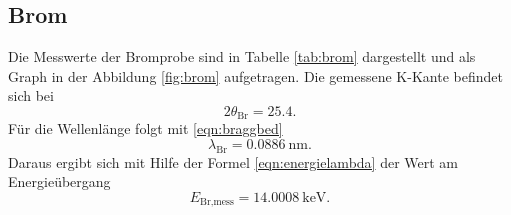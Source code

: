 \subsection{Brom}

Die Messwerte der Bromprobe sind in Tabelle \ref{tab:brom} dargestellt und als
Graph in der Abbildung \ref{fig:brom} aufgetragen.
Die gemessene K-Kante befindet sich bei
\begin{equation}
  2\theta_\text{Br} = 25.4 .
\end{equation}
Für die Wellenlänge folgt mit \eqref{eqn:braggbed}
\begin{equation}
  \lambda_\text{Br} = \SI{0.0886}{\nano\meter}.
\end{equation}
Daraus ergibt sich mit Hilfe der Formel \eqref{eqn:energielambda}
der Wert am Energieübergang
\begin{equation}
  E_\text{Br,mess} = \SI{14.0008}{\kilo\electronvolt}.
\end{equation}

